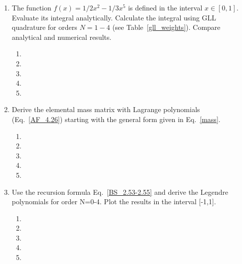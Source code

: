 \begin{enumerate}
\begin{enumerate}
\item[]
\item[] 
\end{enumerate}
\item
The function $f(x)=1/2 x^2-1/3 x^5$ is defined in  the interval $x\in[0,1]$. Evaluate its integral analytically. Calculate the integral using GLL quadrature  for orders $N=1-4$ (see Table~\ref{gll_weights}).  Compare analytical and numerical results.  
\begin{enumerate}
\item[]
\item[]
\item[] 
\item[]
\item[] 
\end{enumerate}
\item
Derive the  elemental mass matrix with Lagrange polynomials (Eq.~\ref{AF_4.26}) starting with the general form given in Eq.~\ref{mass}.
\begin{enumerate}
\item[]
\item[]
\item[] 
\item[]
\item[] 
\end{enumerate}
\item
Use the recursion formula Eq.~\ref{BS_2.53-2.55} and derive the Legendre polynomials for order N=0-4. Plot the results in the interval [-1,1]. 
\begin{enumerate}
\item[]
\item[]
\item[] 
\item[]
\item[] 
\end{enumerate}
\end{enumerate}

